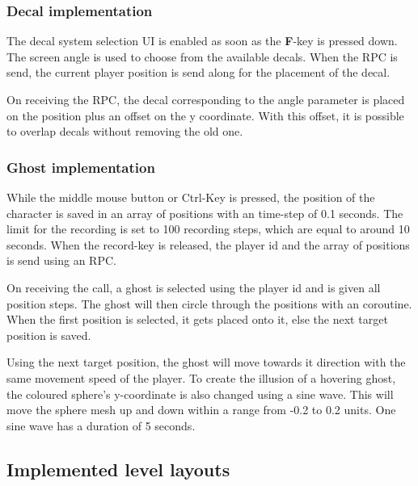 \subsubsection{Decal implementation}

The decal system selection UI is enabled as soon as the \textbf{F}-key is pressed down. The screen angle is used to choose from the available decals. When the RPC is send, the current player position is send along for the placement of the decal.

On receiving the RPC, the decal corresponding to the angle parameter is placed on the position plus an offset on the y coordinate. With this offset, it is possible to overlap decals without removing the old one.

\subsubsection{Ghost implementation}

While the middle mouse button or Ctrl-Key is pressed, the position of the character is saved in an array of positions with an time-step of 0.1 seconds. The limit for the recording is set to 100 recording steps, which are equal to around 10 seconds.
When the record-key is released, the player id and the array of positions is send using an RPC.

On receiving the call, a ghost is selected using the player id and is given all position steps. The ghost will then circle through the positions with an coroutine. When the first position is selected, it gets placed onto it, else the next target position is saved. 

Using the next target position, the ghost will move towards it direction with the same movement speed of the player. To create the illusion of a hovering ghost, the coloured sphere's y-coordinate is also changed using a sine wave. This will move the sphere mesh up and down within a range from -0.2 to 0.2 units. One sine wave has a duration of 5 seconds.



\newpage
\subsection{Implemented level layouts}
\label{section:level layouts}

